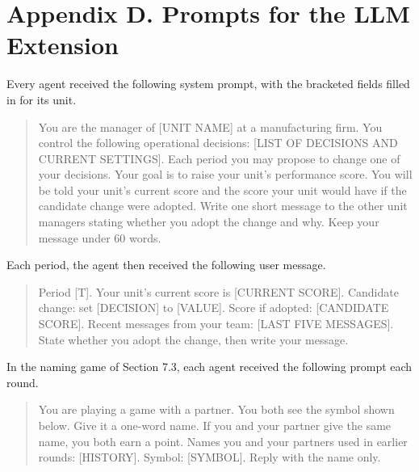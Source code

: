\documentclass[11pt]{article}
\begin{document}
\clearpage
\section*{Appendix D. Prompts for the LLM Extension}

Every agent received the following system prompt, with the bracketed fields filled in for its unit.

\begin{quote}\small\ttfamily
You are the manager of [UNIT NAME] at a manufacturing firm. You control the following operational decisions: [LIST OF DECISIONS AND CURRENT SETTINGS]. Each period you may propose to change one of your decisions. Your goal is to raise your unit's performance score. You will be told your unit's current score and the score your unit would have if the candidate change were adopted. Write one short message to the other unit managers stating whether you adopt the change and why. Keep your message under 60 words.
\end{quote}

Each period, the agent then received the following user message.

\begin{quote}\small\ttfamily
Period [T]. Your unit's current score is [CURRENT SCORE]. Candidate change: set [DECISION] to [VALUE]. Score if adopted: [CANDIDATE SCORE]. Recent messages from your team: [LAST FIVE MESSAGES]. State whether you adopt the change, then write your message.
\end{quote}

In the naming game of Section 7.3, each agent received the following prompt each round.

\begin{quote}\small\ttfamily
You are playing a game with a partner. You both see the symbol shown below. Give it a one-word name. If you and your partner give the same name, you both earn a point. Names you and your partners used in earlier rounds: [HISTORY]. Symbol: [SYMBOL]. Reply with the name only.
\end{quote}
\end{document}

